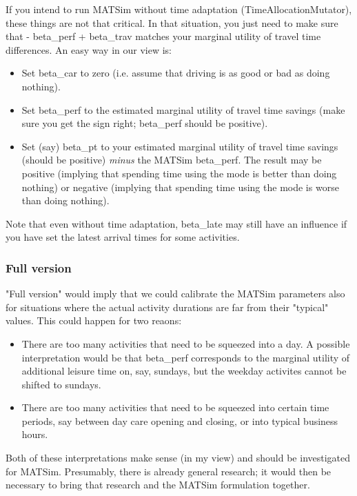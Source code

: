 \documentclass[a4paper,11pt]{report}
\begin{document}
If you intend to run MATSim without time adaptation  (TimeAllocationMutator), these things are not that critical. In  that situation, you just need to make sure that - beta\_perf + beta\_trav  matches your marginal utility of travel time differences. An easy  way in our view is:
\begin{itemize}
	\item Set beta\_car to zero (i.e. assume that driving is as good or bad as doing nothing).
	\item Set beta\_perf to the estimated marginal utility of travel time  savings (make sure you get the sign right; beta\_perf should be  positive).
	\item Set (say) beta\_pt to your estimated marginal utility of travel time savings (should be positive) \emph{minus}  the MATSim beta\_perf. The result may be positive (implying that  spending time using the mode is better than doing nothing) or negative  (implying that spending time using the mode is worse than doing  nothing).
\end{itemize}

Note that even without time adaptation, beta\_late may still have  an influence if you have set the latest arrival times for some  activities.

\subsubsection{Full version}

"Full version" would imply that we could calibrate the MATSim  parameters also for situations where the actual activity durations are  far from their "typical" values. This could happen for two reaons:
\begin{itemize}
	\item There are too many activities that need to be squeezed into a  day. A possible interpretation would be that beta\_perf corresponds  to the marginal utility of additional leisure time on, say, sundays,  but the weekday activites cannot be shifted to sundays.
	\item There are too many activities that need to be squeezed into certain  time periods, say between day care opening and closing, or into typical  business hours.
\end{itemize}

Both of these interpretations make sense (in my view) and should  be investigated for MATSim. Presumably, there is already general  research; it would then be necessary to bring that research and the  MATSim formulation together.
\end{document}
